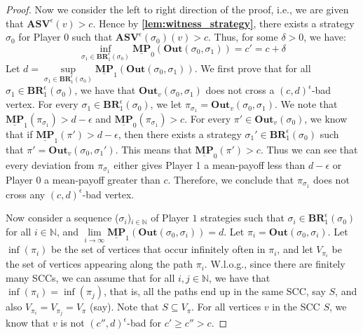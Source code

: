 \begin{proof}
Now we consider the left to right direction of the proof, i.e., we are given that $\mathbf{ASV}^{\epsilon}(v) > c$. 
Hence by \textbf{\cref{lem:witness_strategy}}, there exists a strategy $\sigma_0$ for Player $0$ such that $\mathbf{ASV}^{\epsilon}(\sigma_0)(v) > c$. Thus, for some $\delta > 0$, we have:
\begin{equation*}
    \inf\limits_{\sigma_1 \in \mathbf{BR}_1^{\epsilon}(\sigma_0)} \underline{\mathbf{MP}}_0(\mathbf{Out}(\sigma_0, \sigma_1)) = c' = c + \delta
\end{equation*}
Let $d = \sup\limits_{\sigma_1 \in \mathbf{BR}_1^{\epsilon}(\sigma_0)} \underline{\mathbf{MP}}_1(\mathbf{Out}(\sigma_0, \sigma_1))$. We first prove that for all $\sigma_1 \in \mathbf{BR}_1^{\epsilon}(\sigma_0)$, we have that $\mathbf{Out}_v(\sigma_0, \sigma_1)$ does not cross a $(c,d)^{\epsilon}$-bad vertex. For every $\sigma_1 \in \mathbf{BR}_1^{\epsilon}(\sigma_0)$, we let $\pi_{\sigma_1} = \mathbf{Out}_v(\sigma_0, \sigma_1)$. We note that $\underline{\mathbf{MP}}_1(\pi_{\sigma_1}) > d -\epsilon$ and $\underline{\mathbf{MP}}_0(\pi_{\sigma_1}) > c$. For every $\pi' \in \mathbf{Out}_v(\sigma_0)$, we know that if $\underline{\mathbf{MP}}_1(\pi') > d - \epsilon$, then there exists a strategy $\sigma_1' \in \mathbf{BR}_1^{\epsilon}(\sigma_0)$ such that $\pi' = \mathbf{Out}_v(\sigma_0, \sigma_1')$. This means that $\underline{\mathbf{MP}}_0(\pi') > c$. Thus we can see that every deviation from $\pi_{\sigma_1}$ either gives Player 1 a mean-payoff less than $d - \epsilon$ or Player 0 a mean-payoff greater than $c$. Therefore, we conclude that $\pi_{\sigma_1}$ does not cross any $(c,d)^{\epsilon}$-bad vertex. 

Now consider a sequence ($\sigma_i$)$_{i \in \mathbb{N}}$ of Player $1$ strategies such that $\sigma_i \in \mathbf{BR}_1^{\epsilon}(\sigma_0)$ for all $i \in \mathbb{N}$, and $\lim \limits_{i \to \infty} \underline{\mathbf{MP}}_1(\mathbf{Out}(\sigma_0, \sigma_i))=d$. Let $\pi_i = \mathbf{Out}(\sigma_0, \sigma_i)$.
Let $\inf(\pi_i)$ be the set of vertices that occur infinitely often in $\pi_i$, and let $V_{\pi_i}$ be the set of vertices appearing along the path $\pi_i$.
W.l.o.g., since there are finitely many SCCs, we can assume that for all $i, j \in \mathbb{N}$, we have that $\inf(\pi_i) = \inf(\pi_j)$, that is, all the paths end up in the same SCC, say $S$, and also $V_{\pi_i} = V_{\pi_j}=V_{\pi}$ (say). 
Note that $S \subseteq V_{\pi}$.
For all vertices $v$ in the SCC $S$, we know that $v$ is not $(c'',d)^{\epsilon}$-bad for $c'\geqslant c''> c$.


\end{proof}
